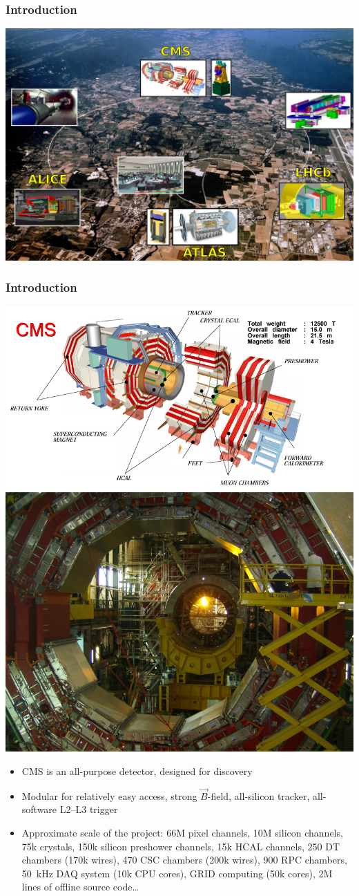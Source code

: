 \documentclass[compress]{beamer}
\begin{document}
\begin{frame}
\frametitle{Introduction}
\includegraphics[width=\linewidth]{lhc.pdf}
\end{frame}

\begin{frame}
\frametitle{Introduction}
\includegraphics[height=3.3 cm]{cms_schematic.png}
\includegraphics[height=3.3 cm]{sun_shines_in_the_detector.jpg}

\begin{itemize}
\item CMS is an all-purpose detector, designed for discovery

\item Modular for relatively easy access, strong
  $\vec{B}$-field, all-silicon tracker, all-software L2--L3 trigger

\item Approximate scale of the project: 66M pixel channels, 10M
  silicon channels, 75k crystals, 150k silicon preshower channels, 15k
  HCAL channels, 250 DT chambers (170k wires), 470 CSC chambers (200k
  wires), 900 RPC chambers, 50~kHz DAQ system (10k CPU cores), GRID
  computing (50k cores), 2M lines of offline source code\ldots
\end{itemize}
\end{frame}
\end{document}
